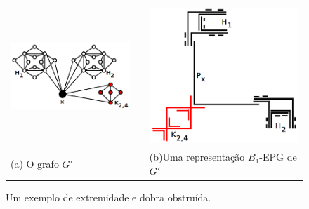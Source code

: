 \begin{figure}[h]
  \centering
  \begin{tabular}{p{6cm} p{1cm} p{6cm}}
     \includegraphics[width=5cm, center]{./img/grafoDobraExtremidadeObstruida2.png} &  &\includegraphics[width=6cm, center]{./img/extremidadeDobraObstruida5.png}  \\%
    \footnotesize \centering (a) O grafo $G'$& & \footnotesize \centering (b)Uma representação $B_1$-EPG de $G'$%
  \end{tabular}
 \caption{Um exemplo de extremidade e dobra obstruída.} \label{fig:extremidadeDobraObstruida}
\end{figure}